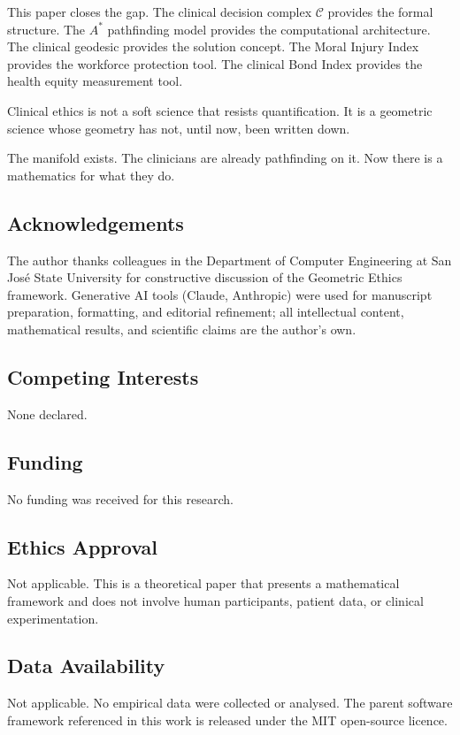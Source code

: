 \documentclass[12pt]{article}
\theoremstyle{definition}
\theoremstyle{remark}
\newcommand{\C}{\mathcal{C}}               %
\begin{document}
This paper closes the gap.  The clinical decision complex $\C$ provides the formal structure.  The $A^*$ pathfinding model provides the computational architecture.  The clinical geodesic provides the solution concept.  The Moral Injury Index provides the workforce protection tool.  The clinical Bond Index provides the health equity measurement tool.

Clinical ethics is not a soft science that resists quantification.  It is a geometric science whose geometry has not, until now, been written down.

The manifold exists.  The clinicians are already pathfinding on it.  Now there is a mathematics for what they do.



\subsection*{Acknowledgements}
The author thanks colleagues in the Department of Computer Engineering at San Jos\'{e} State University for constructive discussion of the Geometric Ethics framework.  Generative AI tools (Claude, Anthropic) were used for manuscript preparation, formatting, and editorial refinement; all intellectual content, mathematical results, and scientific claims are the author's own.

\subsection*{Competing Interests}
None declared.

\subsection*{Funding}
No funding was received for this research.

\subsection*{Ethics Approval}
Not applicable.  This is a theoretical paper that presents a mathematical framework and does not involve human participants, patient data, or clinical experimentation.

\subsection*{Data Availability}
Not applicable.  No empirical data were collected or analysed.  The parent software framework referenced in this work is released under the MIT open-source licence.
\end{document}
